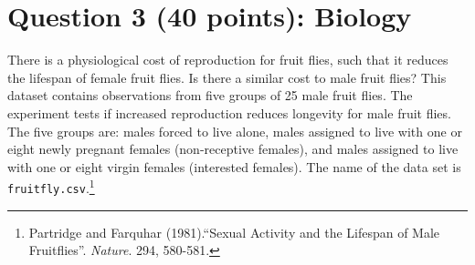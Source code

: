 \documentclass[12pt,letterpaper]{article}
\begin{document}
\newpage
	\section*{Question 3 (40 points): Biology}

There is a physiological cost of reproduction for fruit flies, such that it reduces the lifespan of female fruit flies.  Is there a similar cost to male fruit flies?  This dataset contains observations from five groups of 25 male fruit flies. The experiment tests if increased reproduction reduces longevity for male fruit flies. The five groups are: males forced to live alone, males assigned to live with one or eight newly pregnant females (non-receptive females), and males assigned to live with one or eight virgin females (interested females). The name of the data set is \texttt{fruitfly.csv}.\footnote{Partridge and Farquhar (1981).``Sexual Activity and the Lifespan of Male Fruitflies''. \textit{Nature}. 294, 580-581.}
	\vspace{1cm}
\end{document}
